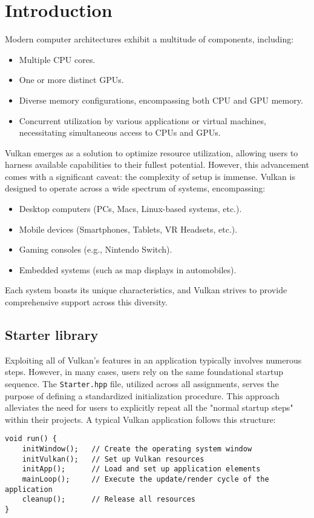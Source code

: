 \section{Introduction}

Modern computer architectures exhibit a multitude of components, including:
\begin{itemize}
    \item Multiple CPU cores.
    \item One or more distinct GPUs.
    \item Diverse memory configurations, encompassing both CPU and GPU memory.
    \item Concurrent utilization by various applications or virtual machines, necessitating simultaneous access to CPUs and GPUs.
\end{itemize}

Vulkan emerges as a solution to optimize resource utilization, allowing users to harness available capabilities to their fullest potential. 
However, this advancement comes with a significant caveat: the complexity of setup is immense.
Vulkan is designed to operate across a wide spectrum of systems, encompassing:
\begin{itemize}
    \item Desktop computers (PCs, Macs, Linux-based systems, etc.).
    \item Mobile devices (Smartphones, Tablets, VR Headsets, etc.).
    \item Gaming consoles (e.g., Nintendo Switch).
    \item Embedded systems (such as map displays in automobiles).
\end{itemize}
Each system boasts its unique characteristics, and Vulkan strives to provide comprehensive support across this diversity.

\subsection{Starter library}
Exploiting all of Vulkan's features in an application typically involves numerous steps. 
However, in many cases, users rely on the same foundational startup sequence.
The \texttt{Starter.hpp} file, utilized across all assignments, serves the purpose of defining a standardized initialization procedure. 
This approach alleviates the need for users to explicitly repeat all the "normal startup steps" within their projects.
A typical Vulkan application follows this structure:
\begin{verbatim}
void run() {
    initWindow();   // Create the operating system window
    initVulkan();   // Set up Vulkan resources
    initApp();      // Load and set up application elements
    mainLoop();     // Execute the update/render cycle of the application
    cleanup();      // Release all resources
}
\end{verbatim}

